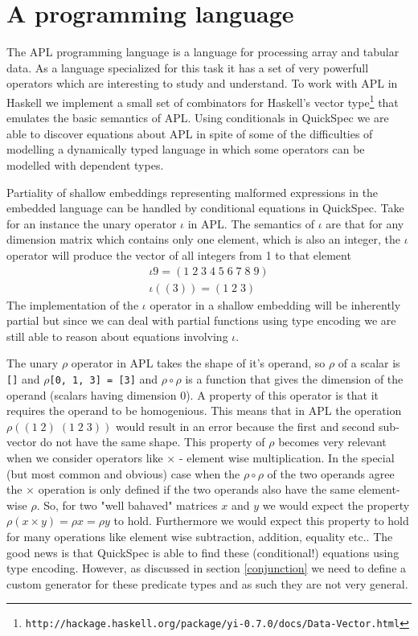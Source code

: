 \section{A programming language}\label{apl}
The APL programming language \cite{Iverson1962}\cite{APLdic}
is a language for processing array and tabular data.
As a language specialized for this task it has a set of very powerfull
operators which are interesting to study and understand.
To work with APL in Haskell we implement a small
set of combinators for Haskell's vector
type\footnote{\texttt{http://hackage.haskell.org/package/yi-0.7.0/docs/Data-Vector.html}}
that emulates the basic semantics of APL.
Using conditionals in QuickSpec we are able to discover
equations about APL in spite of some of the
difficulties of modelling a dynamically typed language
in which some operators can be modelled with dependent types.

Partiality of shallow embeddings representing malformed expressions in the
embedded language can be handled by conditional equations in QuickSpec.
Take for an instance the unary operator $\iota$ in APL. The semantics
of $\iota$ are that for any dimension matrix which contains only one element, which is also
an integer, the $\iota$ operator will produce the vector of all integers from 1 to that element
\begin{gather*}
    \iota 9 = (1\;2\;3\;4\;5\;6\;7\;8\;9)\\
    \iota ((3)) = (1\;2\;3)
\end{gather*}
The implementation of the $\iota$ operator in a shallow embedding will be inherently partial
but since we can deal with partial functions using type encoding we are still able to reason
about equations involving $\iota$.

The unary $\rho$ operator in APL takes the shape of it's operand,
so $\rho$ of a scalar is \texttt{[]} 
and $\rho$\texttt{[0, 1, 3] = [3]} and
$\rho\circ\rho$ is a function that gives the dimension of the operand (scalars having dimension 0).
A property of this operator is that it requires the operand to be homogenious.
This means that in APL the operation $\rho((1\;2)\;(1\;2\;3))$
would result in an error because the first and second sub-vector do not have the same shape.
This property of $\rho$ becomes very relevant when we consider operators like $\times$ - element wise
multiplication. In the special (but most common and obvious) case
when the $\rho\circ\rho$ of the two operands agree the $\times$ operation
is only defined if the two operands also have the same element-wise $\rho$. So, for two "well bahaved" matrices
$x$ and $y$ we would expect the property $\rho(x \times y) = \rho x = \rho y$ to hold. Furthermore
we would expect this property to hold for many operations like element wise subtraction, addition, equality etc..
The good news is that QuickSpec is able to find these (conditional!) equations using type encoding. However,
as discussed in section \ref{conjunction} we need to define a custom generator for these predicate types
and as such they are not very general.

